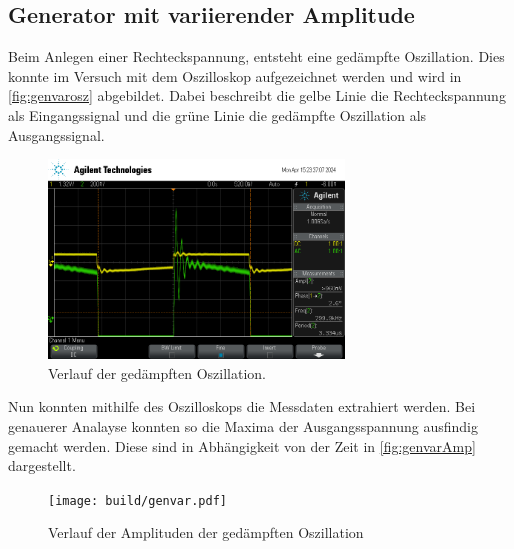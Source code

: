 \subsection{Generator mit variierender Amplitude}
Beim Anlegen einer Rechteckspannung, entsteht eine gedämpfte Oszillation. Dies konnte im Versuch mit dem Oszilloskop aufgezeichnet werden und 
wird  in \autoref{fig:genvarosz} abgebildet. Dabei beschreibt die gelbe Linie die Rechteckspannung als Eingangssignal und die grüne Linie 
die gedämpfte Oszillation als Ausgangssignal.
\begin{figure}
    \centering
    \includegraphics[width=0.7\textwidth]{genvarplot.png}
    \caption{Verlauf der gedämpften Oszillation.}
    \label{fig:genvarosz}
\end{figure}
Nun konnten mithilfe des Oszilloskops die Messdaten extrahiert werden. Bei genauerer Analayse konnten so die Maxima der Ausgangsspannung 
ausfindig gemacht werden. Diese sind in Abhängigkeit von der Zeit in \autoref{fig:genvarAmp} dargestellt.
\begin{figure}
    \centering
    \texttt{[image: build/genvar.pdf]}
    \caption{Verlauf der Amplituden der gedämpften Oszillation}
    \label{fig:genvarAmp}
\end{figure}